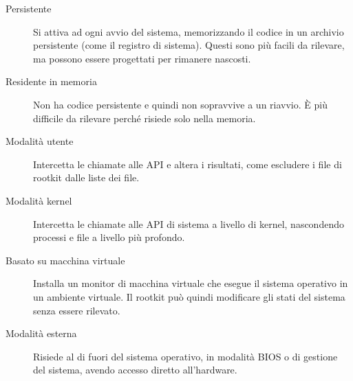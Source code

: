 \begin{description}
    \item[Persistente] Si attiva ad ogni avvio del sistema, memorizzando il codice in un archivio persistente (come il registro di sistema). Questi sono più facili da rilevare, ma possono essere progettati per rimanere nascosti.
    
    \item[Residente in memoria] Non ha codice persistente e quindi non sopravvive a un riavvio. È più difficile da rilevare perché risiede solo nella memoria.
    
    \item[Modalità utente] Intercetta le chiamate alle API e altera i risultati, come escludere i file di rootkit dalle liste dei file.
    
    \item[Modalità kernel] Intercetta le chiamate alle API di sistema a livello di kernel, nascondendo processi e file a livello più profondo.
    
    \item[Basato su macchina virtuale] Installa un monitor di macchina virtuale che esegue il sistema operativo in un ambiente virtuale. Il rootkit può quindi modificare gli stati del sistema senza essere rilevato.
    
    \item[Modalità esterna] Risiede al di fuori del sistema operativo, in modalità BIOS o di gestione del sistema, avendo accesso diretto all'hardware.
\end{description}